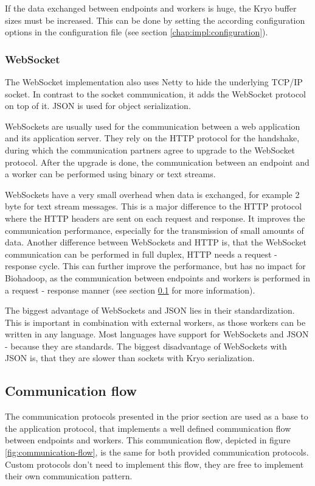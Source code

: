 If the data exchanged between endpoints and workers is huge, the Kryo buffer sizes must be increased. This can be done by setting the according configuration options in the configuration file (see section \ref{chap:impl:configuration}).

\subsubsection{WebSocket}
The WebSocket implementation also uses Netty to hide the underlying TCP/IP socket. In contrast to the socket communication, it adds the WebSocket protocol on top of it. JSON is used for object serialization.

WebSockets are usually used for the communication between a web application and its application server. They rely on the HTTP protocol for the handshake, during which the communication partners agree to upgrade to the WebSocket protocol. After the upgrade is done, the communication between an endpoint and a worker can be performed using binary or text streams.

WebSockets have a very small overhead when data is exchanged, for example 2 byte for text stream messages. This is a major difference to the HTTP protocol where the HTTP headers are sent on each request and response. It improves the communication performance, especially for the transmission of small amounts of data. Another difference between WebSockets and HTTP is, that the WebSocket communication can be performed in full duplex, HTTP needs a request - response cycle. This can further improve the performance, but has no impact for Biohadoop, as the communication between endpoints and workers is performed in a request - response manner (see section \ref{chap:impl:communication-flow} for more information).

The biggest advantage of WebSockets and JSON lies in their standardization. This is important in combination with external workers, as those workers can be written in any language. Most languages have support for WebSockets and JSON - because they are standards. The biggest disadvantage of WebSockets with JSON is, that they are slower than sockets with Kryo serialization.

\subsection{Communication flow}
\label{chap:impl:communication-flow}
The communication protocols presented in the prior section are used as a base to the application protocol, that implements a well defined communication flow between endpoints and workers. This communication flow, depicted in figure \ref{fig:communication-flow}, is the same for both provided communication protocols. Custom protocols don't need to implement this flow, they are free to implement their own communication pattern.

